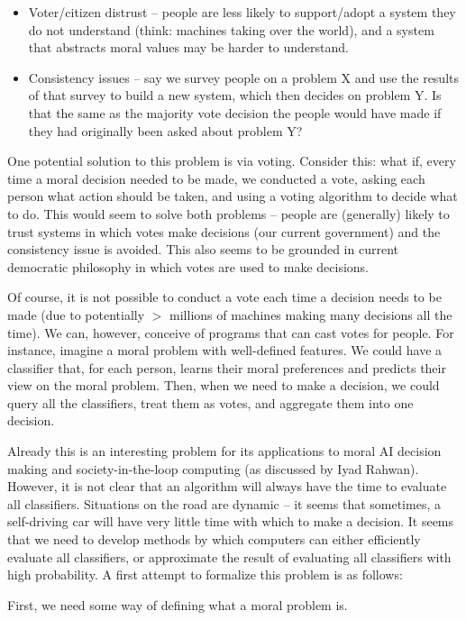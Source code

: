 \documentclass[11pt]{article}
\theoremstyle{definition}
\begin{document}
\begin{itemize}
\item Voter/citizen distrust -- people are less likely to support/adopt a system they do not understand (think: machines taking over the world), and a system that abstracts moral values may be harder to understand.

\item Consistency issues -- say we survey people on a problem X and use the results of that survey to build a new system, which then decides on problem Y. Is that the same as the majority vote decision the people would have made if they had originally been asked about problem Y?
\end{itemize}
One potential solution to this problem is via voting. Consider this: what if, every time a moral decision needed to be made, we conducted a vote, asking each person what action should be taken, and using a voting algorithm to decide what to do. This would seem to solve both problems -- people are (generally) likely to trust systems in which votes make decisions (our current government) and the consistency issue is avoided. This also seems to be grounded in current democratic philosophy in which votes are used to make decisions.

Of course, it is not possible to conduct a vote each time a decision needs to be made (due to potentially $>$ millions of machines making many decisions all the time). We can, however, conceive of programs that can cast votes for people. For instance, imagine a moral problem with well-defined features. We could have a classifier that, for each person, learns their moral preferences and predicts their view on the moral problem. Then, when we need to make a decision, we could query all the classifiers, treat them as votes, and aggregate them into one decision. 

Already this is an interesting problem for its applications to moral AI decision making and society-in-the-loop computing (as discussed by Iyad Rahwan). However, it is not clear that an algorithm will always have the time to evaluate all classifiers. Situations on the road are dynamic  -- it seems that sometimes, a self-driving car will have very little time with which to make a decision. It seems that we need to develop methods by which computers can either efficiently evaluate all classifiers, or approximate the result of evaluating all classifiers with high probability. A first attempt to formalize this problem is as follows:

First, we need some way of defining what a moral problem is. 
\end{document}
